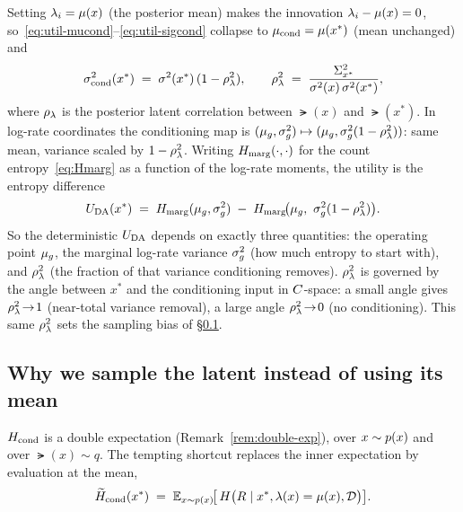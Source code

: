 Setting $\lambda_i=\mu(x)$ (the posterior mean) makes the innovation
$\lambda_i-\mu(x)=0$, so~\eqref{eq:util-mucond}--\eqref{eq:util-sigcond} collapse
to $\mu_{\mathrm{cond}}=\mu(x^{*})$ (mean unchanged) and
%
\begin{equation}
  \sigma^{2}_{\mathrm{cond}}(x^{*}) \;=\; \sigma^{2}(x^{*})\,(1-\rho_{\lambda}^{2}),
  \qquad
  \rho_{\lambda}^{2} \;=\; \frac{\Sigma_{x^{*}}^{2}}{\sigma^{2}(x)\,\sigma^{2}(x^{*})},
  \label{eq:varreduce}
\end{equation}
%
where $\rho_{\lambda}$ is the posterior latent correlation between $\lat(x)$ and
$\lat(x^{*})$. In log-rate coordinates the conditioning map is
$(\mu_{g},\sigma_{g}^{2})\mapsto(\mu_{g},\sigma_{g}^{2}(1-\rho_{\lambda}^{2}))$: same mean, variance scaled by
$1-\rho_{\lambda}^{2}$. Writing $H_{\mathrm{marg}}(\cdot,\cdot)$ for the count
entropy~\eqref{eq:Hmarg} as a function of the log-rate moments, the utility is the
entropy difference
%
\begin{equation}
  U_{\mathrm{DA}}(x^{*}) \;=\; H_{\mathrm{marg}}(\mu_{g},\sigma_{g}^{2}) \;-\; H_{\mathrm{marg}}\!\big(\mu_{g},\ \sigma_{g}^{2}(1-\rho_{\lambda}^{2})\big).
  \label{eq:da-deterministic}
\end{equation}
%
So the deterministic $U_{\mathrm{DA}}$ depends on exactly three quantities: the operating
point $\mu_{g}$, the marginal log-rate variance $\sigma_{g}^{2}$ (how much entropy to start
with), and $\rho_{\lambda}^{2}$ (the fraction of that variance conditioning removes).
$\rho_{\lambda}^{2}$ is governed by the angle between $x^{*}$ and the conditioning input in
$C$-space: a small angle gives $\rho_{\lambda}^{2}\!\to\!1$ (near-total variance
removal), a large angle $\rho_{\lambda}^{2}\!\to\!0$ (no conditioning). This same $\rho_{\lambda}^{2}$
sets the sampling bias of \S\ref{subsec:why-sample}.

\subsection{Why we sample the latent instead of using its mean}
\label{subsec:why-sample}

$H_{\mathrm{cond}}$ is a double expectation (Remark~\ref{rem:double-exp}), over $x\sim p(x)$ and
over $\lat(x)\sim q$. The tempting shortcut replaces the inner expectation by
evaluation at the mean,
%
\begin{equation}
  \widetilde{H}_{\mathrm{cond}}(x^{*})
  \;=\; \mathbb{E}_{x\sim p(x)}\!\big[\,H\big(R\mid x^{*},\lambda(x)=\mu(x),\mathcal D\big)\big].
  \label{eq:mean-shortcut}
\end{equation}

